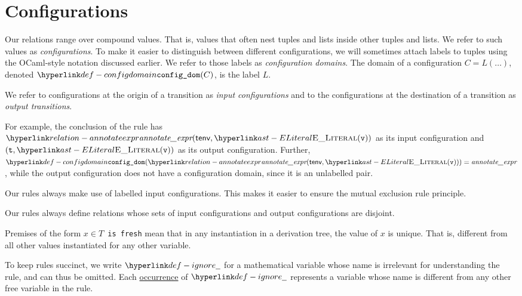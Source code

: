 \hypertarget{def-configuration}{}
\section{Configurations\label{sec:Configurations}}

\hypertarget{def-configdomain}{}
Our relations range over compound values. That is, values that often nest tuples and lists inside other tuples and lists.
We refer to such values as \emph{configurations}. To make it easier to distinguish between different configurations,
we will sometimes attach labels to tuples using the OCaml-style notation discussed earlier.
We refer to those labels as \emph{configuration domains}.
The domain of a configuration $C=L(\ldots)$, denoted $\configdomain{C}$, is the label $L$.

We refer to configurations at the origin of a transition as \emph{input configurations} and to the
configurations at the destination of a transition as \emph{output transitions}.

For example, the conclusion of the rule  has \\
$\annotateexpr(\tenv, \ELiteral(\vv))$ as its input configuration
and $(\vt, \ELiteral(\vv))$ as its output configuration.
Further, \\
$\configdomain{\annotateexpr(\tenv, \ELiteral(\vv))} = \textit{annotate\_expr}$,
while the output configuration does not have a configuration domain, since it is an unlabelled pair.

Our rules always make use of labelled input configurations. This makes it easier to ensure
the mutual exclusion rule principle.

Our rules always define relations whose sets of input configurations and output configurations are disjoint.

\hypertarget{def-freshvariables}{}
\begin{definition}
  Premises of the form \texttt{$x\in T$ is fresh} mean that in any
  instantiation in a derivation tree, the value of $x$ is unique.
  That is, different from all other values instantiated for any other variable.
\end{definition}

\hypertarget{def-ignore}{}
\begin{definition}
To keep rules succinct, we write $\Ignore$ for a mathematical variable whose name is
irrelevant for understanding the rule, and can thus be omitted.
Each \underline{occurrence} of $\Ignore$ represents a variable whose name is
different from any other free variable in the rule.
\end{definition}

